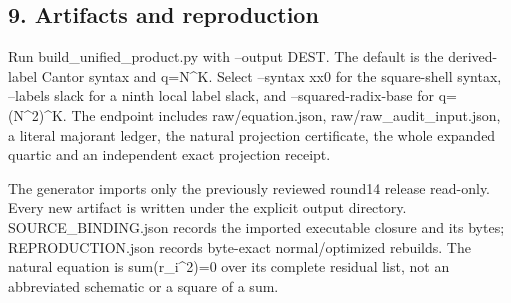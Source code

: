 \subsection*{9. Artifacts and reproduction}



Run build\_\allowbreak{}unified\_\allowbreak{}product.py with --output DEST. The default is the derived-label Cantor syntax and q=\allowbreak{}N\textasciicircum{}\allowbreak{}K. Select --syntax xx0 for the square-shell syntax, --labels slack for a ninth local label slack, and --squared-radix-base for q=\allowbreak{}(N\textasciicircum{}\allowbreak{}2)\textasciicircum{}\allowbreak{}K. The endpoint includes raw/\allowbreak{}equation.json, raw/\allowbreak{}raw\_\allowbreak{}audit\_\allowbreak{}input.json, a literal majorant ledger, the natural projection certificate, the whole expanded quartic and an independent exact projection receipt.



The generator imports only the previously reviewed round14 release read-only. Every new artifact is written under the explicit output directory. SOURCE\_\allowbreak{}BINDING.json records the imported executable closure and its bytes; REPRODUCTION.json records byte-exact normal/\allowbreak{}optimized rebuilds. The natural equation is sum(r\_\allowbreak{}i\textasciicircum{}\allowbreak{}2)=\allowbreak{}0 over its complete residual list, not an abbreviated schematic or a square of a sum.
